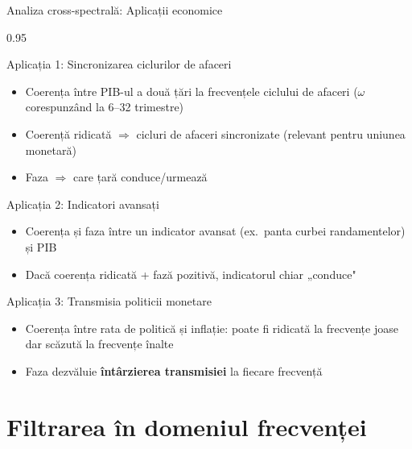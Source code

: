 \documentclass[9pt, aspectratio=169, t]{beamer}
\begin{document}
\begin{frame}{Analiza cross-spectrală: Aplicații economice}
    \begin{cminipage}{0.95\textwidth}
    \vspace{-2mm}
    \begin{block}{Aplicația 1: Sincronizarea ciclurilor de afaceri}
        \begin{itemize}\setlength{\itemsep}{0pt}
            \item Coerența între PIB-ul a două țări la frecvențele ciclului de afaceri ($\omega$ corespunzând la 6--32 trimestre)
            \item Coerență ridicată $\Rightarrow$ cicluri de afaceri sincronizate (relevant pentru uniunea monetară)
            \item Faza $\Rightarrow$ care țară conduce/urmează
        \end{itemize}
    \end{block}
    \vspace{-2mm}
    \begin{exampleblock}{Aplicația 2: Indicatori avansați}
        \begin{itemize}\setlength{\itemsep}{0pt}
            \item Coerența și faza între un indicator avansat (ex.\ panta curbei randamentelor) și PIB
            \item Dacă coerența ridicată + fază pozitivă, indicatorul chiar „conduce"
        \end{itemize}
    \end{exampleblock}
    \vspace{-2mm}
    \begin{alertblock}{Aplicația 3: Transmisia politicii monetare}
        \begin{itemize}\setlength{\itemsep}{0pt}
            \item Coerența între rata de politică și inflație: poate fi ridicată la frecvențe joase dar scăzută la frecvențe înalte
            \item Faza dezvăluie \textbf{întârzierea transmisiei} la fiecare frecvență
        \end{itemize}
    \end{alertblock}
    \end{cminipage}
\end{frame}

\section{Filtrarea în domeniul frecvenței}
\end{document}
